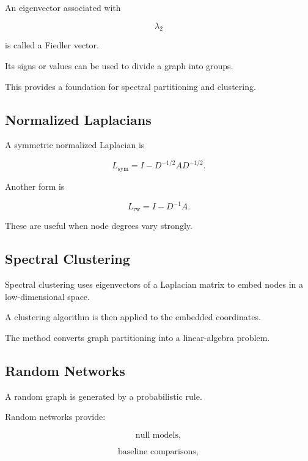 An eigenvector associated with

\[
\lambda_2
\]

is called a Fiedler vector.

Its signs or values can be used to divide a graph into groups.

This provides a foundation for spectral partitioning and clustering.

\subsection{Normalized Laplacians}
\label{subsec:normalized-laplacian}

A symmetric normalized Laplacian is

\[
\boxed{
L_{\mathrm{sym}}
=
I
-
D^{-1/2}AD^{-1/2}.
}
\]

Another form is

\[
\boxed{
L_{\mathrm{rw}}
=
I-D^{-1}A.
}
\]

These are useful when node degrees vary strongly.

\subsection{Spectral Clustering}
\label{subsec:spectral-clustering-network}

Spectral clustering uses eigenvectors of a Laplacian matrix to embed nodes in
a low-dimensional space.

A clustering algorithm is then applied to the embedded coordinates.

The method converts graph partitioning into a linear-algebra problem.

\subsection{Random Networks}
\label{subsec:random-networks}

A random graph is generated by a probabilistic rule.

Random networks provide:

\[
\boxed{
\text{null models},
}
\]

\[
\boxed{
\text{baseline comparisons},
}
\]

